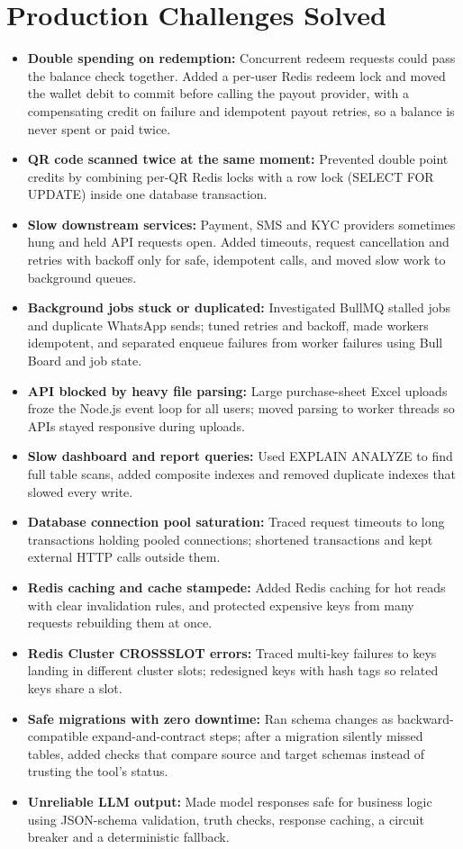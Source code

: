 \documentclass[letterpaper,10pt]{article}
\newcommand{\itemx}[1]{\item\small{#1\vspace{-2pt}}}
\begin{document}
\section{Production Challenges Solved}
\begin{itemize}[leftmargin=.18in]
\itemx{\textbf{Double spending on redemption:} Concurrent redeem requests could pass the balance check together. Added a per-user Redis redeem lock and moved the wallet debit to commit before calling the payout provider, with a compensating credit on failure and idempotent payout retries, so a balance is never spent or paid twice.}
\itemx{\textbf{QR code scanned twice at the same moment:} Prevented double point credits by combining per-QR Redis locks with a row lock (SELECT FOR UPDATE) inside one database transaction.}
\itemx{\textbf{Slow downstream services:} Payment, SMS and KYC providers sometimes hung and held API requests open. Added timeouts, request cancellation and retries with backoff only for safe, idempotent calls, and moved slow work to background queues.}
\itemx{\textbf{Background jobs stuck or duplicated:} Investigated BullMQ stalled jobs and duplicate WhatsApp sends; tuned retries and backoff, made workers idempotent, and separated enqueue failures from worker failures using Bull Board and job state.}
\itemx{\textbf{API blocked by heavy file parsing:} Large purchase-sheet Excel uploads froze the Node.js event loop for all users; moved parsing to worker threads so APIs stayed responsive during uploads.}
\itemx{\textbf{Slow dashboard and report queries:} Used EXPLAIN ANALYZE to find full table scans, added composite indexes and removed duplicate indexes that slowed every write.}
\itemx{\textbf{Database connection pool saturation:} Traced request timeouts to long transactions holding pooled connections; shortened transactions and kept external HTTP calls outside them.}
\itemx{\textbf{Redis caching and cache stampede:} Added Redis caching for hot reads with clear invalidation rules, and protected expensive keys from many requests rebuilding them at once.}
\itemx{\textbf{Redis Cluster CROSSSLOT errors:} Traced multi-key failures to keys landing in different cluster slots; redesigned keys with hash tags so related keys share a slot.}
\itemx{\textbf{Safe migrations with zero downtime:} Ran schema changes as backward-compatible expand-and-contract steps; after a migration silently missed tables, added checks that compare source and target schemas instead of trusting the tool's status.}
\itemx{\textbf{Unreliable LLM output:} Made model responses safe for business logic using JSON-schema validation, truth checks, response caching, a circuit breaker and a deterministic fallback.}
\end{itemize}
\end{document}
